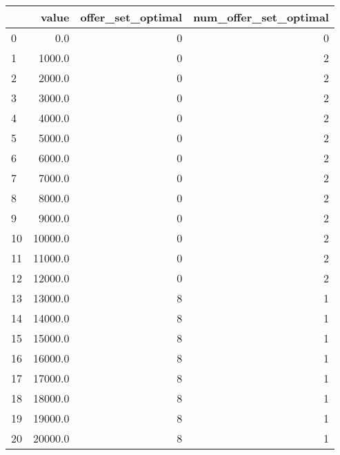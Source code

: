 \begin{table}
	\begin{tabular}{lrrr}
		\toprule
		{} &    value &  offer\_set\_optimal &  num\_offer\_set\_optimal \\
		\midrule
		0  &      0.0 &                  0 &                      0 \\
		1  &   1000.0 &                  0 &                      2 \\
		2  &   2000.0 &                  0 &                      2 \\
		3  &   3000.0 &                  0 &                      2 \\
		4  &   4000.0 &                  0 &                      2 \\
		5  &   5000.0 &                  0 &                      2 \\
		6  &   6000.0 &                  0 &                      2 \\
		7  &   7000.0 &                  0 &                      2 \\
		8  &   8000.0 &                  0 &                      2 \\
		9  &   9000.0 &                  0 &                      2 \\
		10 &  10000.0 &                  0 &                      2 \\
		11 &  11000.0 &                  0 &                      2 \\
		12 &  12000.0 &                  0 &                      2 \\
		13 &  13000.0 &                  8 &                      1 \\
		14 &  14000.0 &                  8 &                      1 \\
		15 &  15000.0 &                  8 &                      1 \\
		16 &  16000.0 &                  8 &                      1 \\
		17 &  17000.0 &                  8 &                      1 \\
		18 &  18000.0 &                  8 &                      1 \\
		19 &  19000.0 &                  8 &                      1 \\
		20 &  20000.0 &                  8 &                      1 \\
		\bottomrule
	\end{tabular}
	
\end{table}

